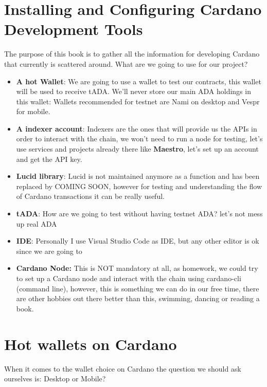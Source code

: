\section{Installing and Configuring Cardano Development Tools}\label{sec:setup}
The purpose of this book is to gather all the information for developing Cardano that currently is scattered around.
What are we going to use for our project?


\begin{itemize}
    \item \textbf{A hot Wallet}: We are going to use a wallet to test our contracts, this wallet will be used to receive tADA. We'll never store our main ADA holdings in this wallet: Wallets recommended for testnet are Nami on desktop and  Vespr for mobile.
    \item \textbf{A indexer account}: Indexers are the ones that will provide us the APIs in order to interact with the chain, we won't need to run a node for testing, let's use services and projects already there like \textbf{Maestro}, let's set up an account and get the API key.
    \item \textbf{Lucid library}: Lucid is not maintained anymore as a function and has been replaced by COMING SOON, however for testing and understanding the flow of Cardano transactions it can be really useful.
    \item \textbf{tADA}: How are we going to test without having testnet ADA? let's not mess up real ADA
    \item  \textbf{IDE}: Personally I use Visual Studio Code as IDE, but any other editor is ok since we are going to 
    \item \textbf{Cardano Node:} This is NOT mandatory at all, as homework, we could try to set up a Cardano node and interact with the chain using cardano-cli (command line), however, this is something we can do in our free time, there are other hobbies out there better than this, swimming, dancing or reading a book.
\end{itemize}

\section{Hot wallets on Cardano}
When it comes to the wallet choice on Cardano the question we should ask ourselves is: Desktop or Mobile?

